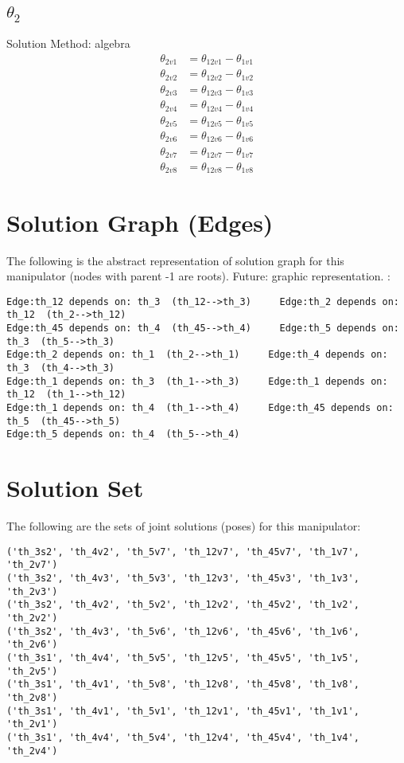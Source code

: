\documentclass[letterpaper]{article}
\begin{document}
\subsection{$\theta_{2}$ } 
Solution Method: algebra
\begin{align}
  \theta_{2v1} &= \theta_{12v1} - \theta_{1v1} \\
  \theta_{2v2} &= \theta_{12v2} - \theta_{1v2} \\
  \theta_{2v3} &= \theta_{12v3} - \theta_{1v3} \\
  \theta_{2v4} &= \theta_{12v4} - \theta_{1v4} \\
  \theta_{2v5} &= \theta_{12v5} - \theta_{1v5} \\
  \theta_{2v6} &= \theta_{12v6} - \theta_{1v6} \\
  \theta_{2v7} &= \theta_{12v7} - \theta_{1v7} \\
  \theta_{2v8} &= \theta_{12v8} - \theta_{1v8} \end{align} 





\section{Solution Graph (Edges)} 

The following is the abstract representation of solution graph for this manipulator (nodes with parent -1 are roots).  Future: graphic representation. :
\begin{verbatim}
Edge:th_12 depends on: th_3  (th_12-->th_3)     Edge:th_2 depends on: th_12  (th_2-->th_12)
Edge:th_45 depends on: th_4  (th_45-->th_4)     Edge:th_5 depends on: th_3  (th_5-->th_3)
Edge:th_2 depends on: th_1  (th_2-->th_1)     Edge:th_4 depends on: th_3  (th_4-->th_3)
Edge:th_1 depends on: th_3  (th_1-->th_3)     Edge:th_1 depends on: th_12  (th_1-->th_12)
Edge:th_1 depends on: th_4  (th_1-->th_4)     Edge:th_45 depends on: th_5  (th_45-->th_5)
Edge:th_5 depends on: th_4  (th_5-->th_4)     \end{verbatim} 



\section{Solution Set}

The following are the sets of joint solutions (poses) for this manipulator:
\begin{verbatim}
('th_3s2', 'th_4v2', 'th_5v7', 'th_12v7', 'th_45v7', 'th_1v7', 'th_2v7')
('th_3s2', 'th_4v3', 'th_5v3', 'th_12v3', 'th_45v3', 'th_1v3', 'th_2v3')
('th_3s2', 'th_4v2', 'th_5v2', 'th_12v2', 'th_45v2', 'th_1v2', 'th_2v2')
('th_3s2', 'th_4v3', 'th_5v6', 'th_12v6', 'th_45v6', 'th_1v6', 'th_2v6')
('th_3s1', 'th_4v4', 'th_5v5', 'th_12v5', 'th_45v5', 'th_1v5', 'th_2v5')
('th_3s1', 'th_4v1', 'th_5v8', 'th_12v8', 'th_45v8', 'th_1v8', 'th_2v8')
('th_3s1', 'th_4v1', 'th_5v1', 'th_12v1', 'th_45v1', 'th_1v1', 'th_2v1')
('th_3s1', 'th_4v4', 'th_5v4', 'th_12v4', 'th_45v4', 'th_1v4', 'th_2v4')
\end{verbatim}
\end{document}
